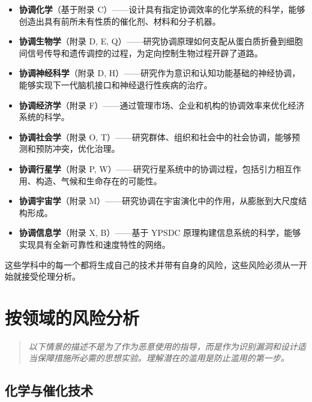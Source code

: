 \documentclass[12pt,a4paper]{article}
\theoremstyle{remark}
\begin{document}
	\begin{itemize}[leftmargin=*]
		\item \textbf{协调化学}（基于附录 C）——设计具有指定协调效率的化学系统的科学，能够创造出具有前所未有性质的催化剂、材料和分子机器。
		
		\item \textbf{协调生物学}（附录 D, E, Q）——研究协调原理如何支配从蛋白质折叠到细胞间信号传导和遗传调控的过程，为定向控制生物过程开辟了道路。
		
		\item \textbf{协调神经科学}（附录 D, H）——研究作为意识和认知功能基础的神经协调，能够实现下一代脑机接口和神经退行性疾病的治疗。
		
		\item \textbf{协调经济学}（附录 F）——通过管理市场、企业和机构的协调效率来优化经济系统的科学。
		
		\item \textbf{协调社会学}（附录 O, T）——研究群体、组织和社会中的社会协调，能够预测和预防冲突，优化治理。
		
		\item \textbf{协调行星学}（附录 P, W）——研究行星系统中的协调过程，包括引力相互作用、构造、气候和生命存在的可能性。
		
		\item \textbf{协调宇宙学}（附录 M）——研究协调在宇宙演化中的作用，从膨胀到大尺度结构形成。
		
		\item \textbf{协调信息学}（附录 X, B）——基于 YPSDC 原理构建信息系统的科学，能够实现具有全新可靠性和速度特性的网络。
	\end{itemize}
	
	这些学科中的每一个都将生成自己的技术并带有自身的风险，这些风险必须从一开始就接受伦理分析。
	
	\section{按领域的风险分析}
	\label{sec:risks}
	
	\begin{quote}
		\emph{以下情景的描述不是为了作为恶意使用的指导，而是作为识别漏洞和设计适当保障措施所必需的思想实验。理解潜在的滥用是防止滥用的第一步。}
	\end{quote}
	
	\subsection{化学与催化技术}
	\label{subsec:chem}
	
\end{document}
